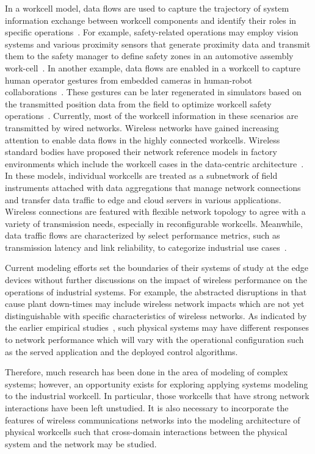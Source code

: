 In a workcell model, data flows are used to capture the trajectory of system information exchange between workcell components and identify their roles in specific operations~\cite{OpenArch}. For example, safety-related operations may employ vision systems and various proximity sensors that generate proximity data and transmit them to the safety manager to define safety zones in an automotive assembly work-cell~\cite{safeeye}. 
In another example, data flows are enabled in a workcell to capture human operator gestures from embedded cameras in human-robot collaborations~\cite{cobotcell}. These gestures can be later regenerated in simulators based on the transmitted position data from the field to optimize workcell safety operations~\cite{Duan2009}. Currently, most of the workcell information in these scenarios are transmitted by wired networks. Wireless networks have gained increasing attention to enable data flows in the highly connected workcells. Wireless standard bodies have proposed their network reference models in factory environments which include the workcell cases in the data-centric architecture~\cite{ETSI889, KPItable}. In these models, individual workcells are treated as a subnetwork of field instruments attached with data aggregations that manage network connections and transfer data traffic to edge and cloud servers in various applications. Wireless connections are featured with flexible network topology to agree with a variety of transmission needs, especially in reconfigurable workcells. Meanwhile, data traffic flows are characterized by select performance metrics, such as transmission latency and link reliability, to categorize industrial use cases~\cite{KPItable}. 

Current modeling efforts set the boundaries of their systems of study at the edge devices without further discussions on the impact of wireless performance on the operations of industrial systems. For example, the abstracted disruptions in \cite{QChang,Liu2012} that cause plant down-times may include wireless network impacts which are not yet distinguishable with specific characteristics of wireless networks. As indicated by the earlier empirical studies~\cite{Liu2016}, such physical systems may have different responses to network performance which will vary with the operational configuration such as the served application and the deployed control algorithms. 

Therefore, much research has been done in the area of modeling of complex systems; however, an opportunity exists for exploring applying systems modeling to the industrial workcell.  In particular, those workcells that have strong network interactions have been left unstudied.  It is also necessary to incorporate the features of wireless communications networks into the modeling architecture of physical workcells such that cross-domain interactions between the physical system and the network may be studied.  

